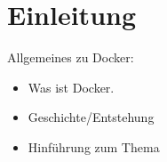\chapter{Einleitung}
\label{sec:einleitung}
Allgemeines zu Docker:
\begin{itemize}
    \item Was ist Docker.
    \item Geschichte/Entstehung
    \item Hinführung zum Thema
\end{itemize}
